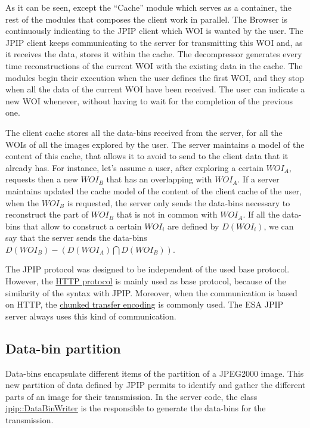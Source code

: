 As it can be seen, except the ``Cache'' module which serves as a container,
the rest of the modules that composes the client work in parallel.
The Browser is continuously indicating to the JPIP client which
WOI is wanted by the user. The JPIP client keeps communicating to
the server for transmitting this WOI and, as it receives the data,
stores it within the cache. The decompressor generates every time
reconstructions of the current WOI with the existing data in the cache.
The modules begin their execution when the user defines the first WOI,
and they stop when all the data of the current WOI have been received.
The user can indicate a new WOI whenever, without
having to wait for the completion of the previous one.

The client cache stores all the data-bins received from the server, for all 
the WOIs of all the images explored by the user. The server 
maintains a model of the content of this cache, that allows it to avoid to
send to the client data that it already has. For instance, let's assume a user, after
exploring a certain $WOI_A$, requests then a new $WOI_B$ that has an
overlapping with $WOI_A$. If a server maintains updated the cache model of the
content of the client cache of the user, when the $WOI_B$ is requested, the
server only sends the data-bins necessary to reconstruct the part of $WOI_B$
that is not in common with $WOI_A$. If all the data-bins that allow to
construct a certain $WOI_i$ are defined by $D(WOI_i)$, we can say that the
server sends the data-bins $D(WOI_B) - \left( D(WOI_A) \bigcap D(WOI_B) \right)$.

The JPIP protocol was designed to be independent of
the used base protocol. However, the \href{http://www.ietf.org/rfc/rfc2616.txt}
{HTTP protocol}
is mainly used as base protocol, because
of the similarity of the syntax with JPIP. Moreover,
when the communication is based on HTTP, the \href{http://en.wikipedia.org/wiki/Chunked_transfer_encoding}
{chunked transfer encoding} is commonly used. The ESA JPIP server
always uses this kind of communication.

\subsection{Data-bin partition}
\label{sec:data-bins}

Data-bins encapsulate different items of the partition
of a JPEG2000 image. This new partition of data defined
by JPIP permits to identify and gather the different parts
of an image for their transmission. In the server code,
the class \hyperlink{classjpip_1_1DataBinWriter}{jpip::DataBinWriter}
is the responsible to generate the data-bins for the
transmission.


